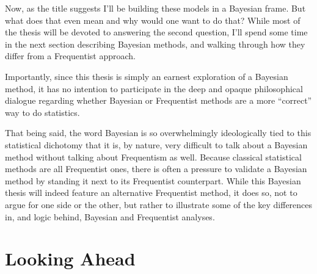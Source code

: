 \documentclass[12pt,twoside]{reedthesis}
\begin{document}
Now, as the title suggests I'll be building these models in a Bayesian frame. But what does that even mean and why would one want to do that? While most of the thesis will be devoted to answering the second question, I'll spend some time in the next section describing Bayesian methods, and walking through how they differ from a Frequentist approach.

Importantly, since this thesis is simply an earnest exploration of a Bayesian method, it has no intention to participate in the deep and opaque philosophical dialogue regarding whether Bayesian or Frequentist methods are a more ``correct'' way to do statistics.

That being said, the word Bayesian is so overwhelmingly ideologically tied to this statistical dichotomy that it is, by nature, very difficult to talk about a Bayesian method without talking about Frequentism as well. Because classical statistical methods are all Frequentist ones, there is often a pressure to validate a Bayesian method by standing it next to its Frequentist counterpart. While this Bayesian thesis will indeed feature an alternative Frequentist method, it does so, not to argue for one side or the other, but rather to illustrate some of the key differences in, and logic behind, Bayesian and Frequentist analyses.

\hypertarget{looking-ahead}{%
\section{Looking Ahead}\label{looking-ahead}}
\end{document}
